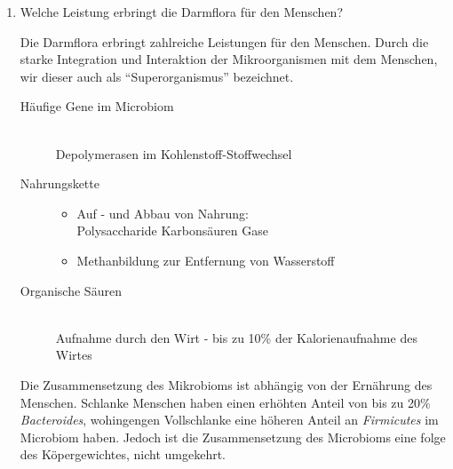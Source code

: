 \begin{enumerate}
	\item Welche Leistung erbringt die Darmflora für den Menschen?
		
		Die Darmflora erbringt zahlreiche Leistungen für den Menschen.
		Durch die starke Integration und Interaktion der Mikroorganismen mit dem Menschen,
		wir dieser auch als ``Superorganismus'' bezeichnet.

		\begin{description}
		\item[Häufige Gene im Microbiom] \hfill \\
			Depolymerasen im Kohlenstoff-Stoffwechsel
		\item[Nahrungskette] \hfill
			\begin{itemize}
			\item Auf - und Abbau von Nahrung: \\
			Polysaccharide \textrightarrow Karbonsäuren \textrightarrow Gase
			\item Methanbildung zur Entfernung von Wasserstoff
			\end{itemize}
		\item[Organische Säuren] \hfill \\
			Aufnahme durch den Wirt - bis zu 10\% der Kalorienaufnahme des Wirtes	
		\end{description}

		Die Zusammensetzung des Mikrobioms ist abhängig von der Ernährung des Menschen.
		Schlanke Menschen haben einen erhöhten Anteil von bis zu 20\% \emph{Bacteroides},
		wohingengen Vollschlanke eine höheren Anteil an \emph{Firmicutes} im Microbiom haben.
		Jedoch ist die Zusammensetzung des Microbioms eine folge des Köpergewichtes,
		nicht umgekehrt.

\end{enumerate}
